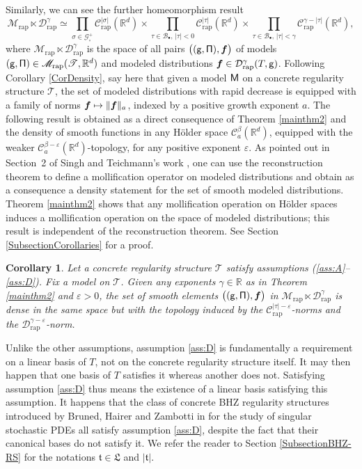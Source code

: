\documentclass[11pt]{article}
\numberwithin{equation}{section}
\newcommand\mto{\mathchoice{\longmapsto}{\mapsto}{\mapsto}{\mapsto}}
\newcommand{\sbullet}{{\scriptscriptstyle\bullet}}
\theoremstyle{plain}
\newtheorem{cor}[thm]{Corollary}
\theoremstyle{definition}
\newcommand{\bsf}{\boldsymbol{f}}
\newcommand{\rap}{\mathrm{rap}}
\newcommand{\scrM}{\mathscr{M}}
\newcommand{\scrT}{\mathscr{T}}
\let\epsilon\varepsilon
\newcommand{\bbR}{\mathbb{R}}
\newcommand{\mcB}{\mathcal{B}}
\newcommand{\mcC}{\mathcal{C}}
\newcommand{\mcD}{\mathcal{D}}
\newcommand{\mcG}{\mathcal{G}}
\begin{document}
Similarly, we can see the further homeomorphism result
\[
\scrM_{\rap}\ltimes\mcD_{\rap}^\gamma \simeq
\prod_{\sigma\in\mcG_\circ^+} \mcC_\rap^{|\sigma|}(\bbR^d) \times \prod_{\tau\in\mcB_\sbullet,\,|\tau|<0} \mcC_\rap^{|\tau|}(\bbR^d)
\times \prod_{\tau\in\mcB_\sbullet,\, |\tau|<\gamma} \mcC_\rap^{\gamma-|\tau|}(\bbR^d),
\]
where $\scrM_{\rap}\ltimes\mcD_{\rap}^\gamma$ is the space of all pairs $\bigl(({\sf g},{\sf\Pi}),\bsf\bigr)$ of models $({\sf g},{\sf\Pi})\in\scrM_{\rap}(\scrT,\bbR^d)$ and modeled distributions $\bsf\in\mcD_{\rap}^\gamma(T,{\sf g})$. Following Corollary \ref{CorDensity}, say here that given a model $\sf M$ on a concrete regularity structure $\mathscr{T}$, the set of modeled distributions with rapid decrease is equipped with a family of norms $\bsf \mto \|\bsf\|_a$, indexed by a positive growth exponent $a$. The following result is obtained as a direct consequence of Theorem \ref{mainthm2} and the density of smooth functions in any Hölder space $\mcC_a^\beta(\bbR^d)$, equipped with the weaker $\mcC_a^{\beta-\epsilon}(\bbR^d)$-topology, for any positive exponent $\epsilon$. As pointed out in Section~2 of Singh and Teichmann's work \cite{SinghTeichmann}, one can use the reconstruction theorem to define a mollification operator on modeled distributions and obtain as a consequence a density statement for the set of smooth modeled distributions. Theorem \ref{mainthm2} shows that any mollification operation on Hölder spaces induces a mollification operation on the space of modeled distributions; this result is independent of the reconstruction theorem. See Section \ref{SubsectionCorollaries} for a proof.

\begin{cor} \label{CorDensitySmoothModelled}
Let a concrete regularity structure $\scrT$ satisfy assumptions \textup{(\ref{ass:A}--\ref{ass:D})}. Fix a model on $\mathscr{T}$. Given any exponents $\gamma\in\bbR$ as in Theorem \ref{mainthm2} and $\epsilon>0$, the set of smooth elements $\bigl(({\sf g},{\sf\Pi}),\bsf\bigr)$ in $\scrM_{\rap}\ltimes\mcD_{\rap}^\gamma$ is dense in the same space but with the topology induced by the $\mcC_{\rap}^{|\tau|-\epsilon}$-norms and the $\mcD_{\rap}^{\gamma-\epsilon}$-norm.
\end{cor}

Unlike the other assumptions, assumption \eqref{ass:D} is fundamentally a requirement on a linear basis of $T$, not on the concrete regularity structure itself. It may then happen that one basis of $T$ satisfies it whereas another does not. Satisfying assumption \eqref{ass:D} thus means the existence of a linear basis satisfying this assumption. It happens that the class of concrete BHZ regularity structures introduced by Bruned, Hairer and Zambotti in \cite{BHZ} for the study of singular stochastic PDEs all satisfy assumption \eqref{ass:D}, despite the fact that their canonical bases do not satisfy it. We refer the reader to Section \ref{SubsectionBHZ-RS} for the notations $\mathfrak{t}\in\mathfrak{L}$ and $|\mathfrak{t}|$.
\end{document}
